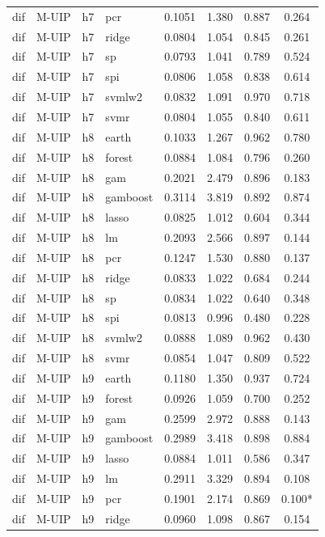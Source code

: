 \begin{ThreePartTable}
\begin{longtable}[t]{llclcccc}
dif & M-UIP & h7 & pcr & 0.1051 & 1.380 & 0.887 & 0.264\\
dif & M-UIP & h7 & ridge & 0.0804 & 1.054 & 0.845 & 0.261\\
dif & M-UIP & h7 & sp & 0.0793 & 1.041 & 0.789 & 0.524\\
dif & M-UIP & h7 & spi & 0.0806 & 1.058 & 0.838 & 0.614\\
dif & M-UIP & h7 & svmlw2 & 0.0832 & 1.091 & 0.970 & 0.718\\
dif & M-UIP & h7 & svmr & 0.0804 & 1.055 & 0.840 & 0.611\\
\addlinespace
dif & M-UIP & h8 & earth & 0.1033 & 1.267 & 0.962 & 0.780\\
dif & M-UIP & h8 & forest & 0.0884 & 1.084 & 0.796 & 0.260\\
dif & M-UIP & h8 & gam & 0.2021 & 2.479 & 0.896 & 0.183\\
dif & M-UIP & h8 & gamboost & 0.3114 & 3.819 & 0.892 & 0.874\\
dif & M-UIP & h8 & lasso & 0.0825 & 1.012 & 0.604 & 0.344\\
dif & M-UIP & h8 & lm & 0.2093 & 2.566 & 0.897 & 0.144\\
dif & M-UIP & h8 & pcr & 0.1247 & 1.530 & 0.880 & 0.137\\
dif & M-UIP & h8 & ridge & 0.0833 & 1.022 & 0.684 & 0.244\\
dif & M-UIP & h8 & sp & 0.0834 & 1.022 & 0.640 & 0.348\\
dif & M-UIP & h8 & spi & 0.0813 & 0.996 & 0.480 & 0.228\\
dif & M-UIP & h8 & svmlw2 & 0.0888 & 1.089 & 0.962 & 0.430\\
dif & M-UIP & h8 & svmr & 0.0854 & 1.047 & 0.809 & 0.522\\
\addlinespace
dif & M-UIP & h9 & earth & 0.1180 & 1.350 & 0.937 & 0.724\\
dif & M-UIP & h9 & forest & 0.0926 & 1.059 & 0.700 & 0.252\\
dif & M-UIP & h9 & gam & 0.2599 & 2.972 & 0.888 & 0.143\\
dif & M-UIP & h9 & gamboost & 0.2989 & 3.418 & 0.898 & 0.884\\
dif & M-UIP & h9 & lasso & 0.0884 & 1.011 & 0.586 & 0.347\\
dif & M-UIP & h9 & lm & 0.2911 & 3.329 & 0.894 & 0.108\\
dif & M-UIP & h9 & pcr & 0.1901 & 2.174 & 0.869 & 0.100*\\
dif & M-UIP & h9 & ridge & 0.0960 & 1.098 & 0.867 & 0.154\\

\end{longtable}
\end{ThreePartTable}
